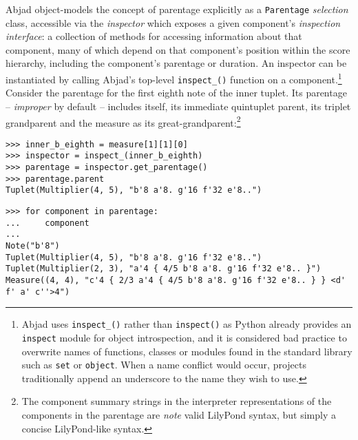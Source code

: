 Abjad object-models the concept of parentage explicitly as a \texttt{Parentage}
\emph{selection} class, accessible via the \emph{inspector} which exposes a
given component's \emph{inspection interface}: a collection of methods for
accessing information about that component, many of which depend on that
component's position within the score hierarchy, including the component's
parentage or duration. An inspector can be instantiated by calling Abjad's
top-level \texttt{inspect\_()} function on a component.\footnote{Abjad uses
\texttt{inspect\_()} rather than \texttt{inspect()} as Python already provides
an \texttt{inspect} module for object introspection, and it is considered bad
practice to overwrite names of functions, classes or modules found in the
standard library such as \texttt{set} or \texttt{object}. When a name conflict
would occur, projects traditionally append an underscore to the name they wish
to use.} Consider the parentage for the first eighth note of the inner tuplet.
Its parentage -- \emph{improper} by default -- includes itself, its immediate
quintuplet parent, its triplet grandparent and the  measure as its
great-grandparent:\footnote{The component summary strings in the interpreter
representations of the components in the parentage are \emph{note} valid
LilyPond syntax, but simply a concise LilyPond-like syntax.}

\begin{comment}
<abjad>
inner_b_eighth = measure[1][1][0]
inspector = inspect_(inner_b_eighth)
parentage = inspector.get_parentage()
parentage.parent
for component in parentage:
    component

</abjad>
\end{comment}

\begin{abjadbookoutput}
\begin{singlespacing}
\vspace{-0.5\baselineskip}
\begin{lstlisting}
>>> inner_b_eighth = measure[1][1][0]
>>> inspector = inspect_(inner_b_eighth)
>>> parentage = inspector.get_parentage()
>>> parentage.parent
Tuplet(Multiplier(4, 5), "b'8 a'8. g'16 f'32 e'8..")
\end{lstlisting}
\begin{lstlisting}
>>> for component in parentage:
...     component
...
Note("b'8")
Tuplet(Multiplier(4, 5), "b'8 a'8. g'16 f'32 e'8..")
Tuplet(Multiplier(2, 3), "a'4 { 4/5 b'8 a'8. g'16 f'32 e'8.. }")
Measure((4, 4), "c'4 { 2/3 a'4 { 4/5 b'8 a'8. g'16 f'32 e'8.. } } <d' f' a' c''>4")
\end{lstlisting}
\end{singlespacing}
\end{abjadbookoutput}

